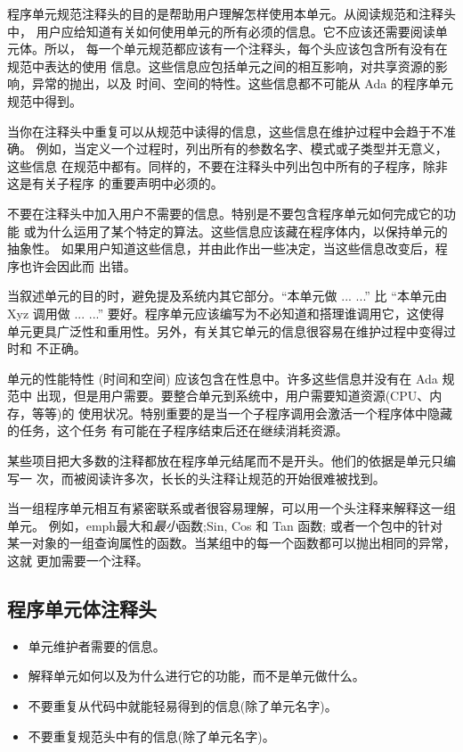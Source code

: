 \begin{blockindent}
程序单元规范注释头的目的是帮助用户理解怎样使用本单元。从阅读规范和注释头中，
用户应给知道有关如何使用单元的所有必须的信息。它不应该还需要阅读单元体。所以，
每一个单元规范都应该有一个注释头，每个头应该包含所有没有在规范中表达的使用
信息。这些信息应包括单元之间的相互影响，对共享资源的影响，异常的抛出，以及
时间、空间的特性。这些信息都不可能从 Ada 的程序单元规范中得到。

当你在注释头中重复可以从规范中读得的信息，这些信息在维护过程中会趋于不准确。
例如，当定义一个过程时，列出所有的参数名字、模式或子类型并无意义，这些信息
在规范中都有。同样的，不要在注释头中列出包中所有的子程序，除非这是有关子程序
的重要声明中必须的。

不要在注释头中加入用户不需要的信息。特别是不要包含程序单元如何完成它的功能
或为什么运用了某个特定的算法。这些信息应该藏在程序体内，以保持单元的抽象性。
如果用户知道这些信息，并由此作出一些决定，当这些信息改变后，程序也许会因此而
出错。

当叙述单元的目的时，避免提及系统内其它部分。``本单元做 ... ...'' 比 ``本单元由
Xyz 调用做 ... ...'' 要好。程序单元应该编写为不必知道和搭理谁调用它，这使得
单元更具广泛性和重用性。另外，有关其它单元的信息很容易在维护过程中变得过时和
不正确。

单元的性能特性 (时间和空间) 应该包含在性息中。许多这些信息并没有在 Ada 规范中
出现，但是用户需要。要整合单元到系统中，用户需要知道资源(CPU、内存，等等)的
使用状况。特别重要的是当一个子程序调用会激活一个程序体中隐藏的任务，这个任务
有可能在子程序结束后还在继续消耗资源。
\end{blockindent}

\begin{blockindent}
某些项目把大多数的注释都放在程序单元结尾而不是开头。他们的依据是单元只编写一
次，而被阅读许多次，长长的头注释让规范的开始很难被找到。
\end{blockindent}

\begin{blockindent}
当一组程序单元相互有紧密联系或者很容易理解，可以用一个头注释来解释这一组单元。
例如，emph{最大}和\emph{最小}函数;Sin, Cos 和 Tan 函数; 或者一个包中的针对
某一对象的一组查询属性的函数。当某组中的每一个函数都可以抛出相同的异常，这就
更加需要一个注释。
\end{blockindent}

\subsection{程序单元体注释头}
\begin{itemize}
    \item 单元维护者需要的信息。
    \item 解释单元如何以及为什么进行它的功能，而不是单元做什么。
    \item 不要重复从代码中就能轻易得到的信息(除了单元名字)。
    \item 不要重复规范头中有的信息(除了单元名字)。
\end{itemize}

